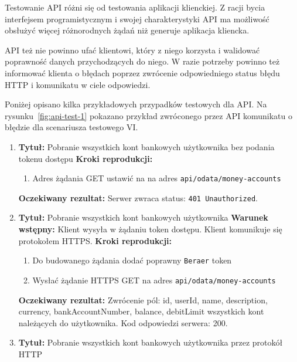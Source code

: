 Testowanie API różni się od testowania aplikacji klienckiej. Z racji bycia interfejsem programistycznym i swojej charakterystyki API ma możliwość obsłużyć więcej różnorodnych żądań niż generuje aplikacja kliencka. 

API też nie powinno ufać klientowi, który z niego korzysta i walidować poprawność danych przychodzących do niego. W razie potrzeby powinno też informować klienta o błędach poprzez zwrócenie odpowiedniego status błędu HTTP i komunikatu w ciele odpowiedzi.

Poniżej opisano kilka przykładowych przypadków testowych dla API. Na rysunku~\ref{fig:api-test-1} pokazano przykład zwróconego przez API komunikatu o błędzie dla scenariusza testowego VI.

\begin{enumerate}[labelwidth=1em,label=\Roman*]
\item 
    \textbf{Tytuł:} Pobranie wszystkich kont bankowych użytkownika bez podania tokenu dostępu \newline
    \textbf{Kroki reprodukcji:}  \begin{enumerate}[label=\arabic*.]
        \item Adres żądania GET ustawić na na adres \texttt{api/odata/money-accounts}
    \end{enumerate}
    \textbf{Oczekiwany rezultat:}  Serwer zwraca status: \texttt{401 Unauthorized}. \newline
\item 
    \textbf{Tytuł:} Pobranie wszystkich kont bankowych użytkownika \newline
    \textbf{Warunek wstępny:} Klient wysyła w żądaniu token dostępu. Klient komunikuje się protokołem HTTPS. \newline
    \textbf{Kroki reprodukcji:}  \begin{enumerate}[label=\arabic*.]
        \item Do budowanego żądania dodać poprawny \texttt{Beraer} token 
        \item Wysłać żądanie HTTPS GET na adres \texttt{api/odata/money-accounts}
    \end{enumerate}
    \textbf{Oczekiwany rezultat:}  Zwrócenie pól: id, userId, name, description, currency, bankAccountNumber, balance, debitLimit wszystkich kont należących do użytkownika. Kod odpowiedzi serwera: 200. \newline
\item 
    \textbf{Tytuł:} Pobranie wszystkich kont bankowych użytkownika przez protokół HTTP  \newline

\end{enumerate}
